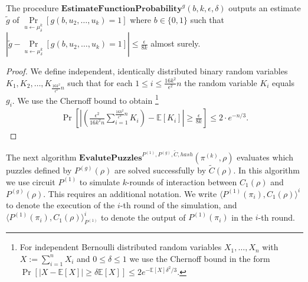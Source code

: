 %
\begin{lemma}
  \label{lemma:estimate_of_g}
  The procedure $\textbf{EstimateFunctionProbability}^{g}(b, k, \epsilon, \delta)$ outputs an estimate $\widetilde{g}$
  of $\underset{u \leftarrow \mu_{\delta}^k}{\Pr}[g(b, u_2, \dots, u_k) = 1]$ where $b \in \{0,1\}$
  such that $| \widetilde{g} - \underset{u \leftarrow \mu_{\delta}^{k}}{\Pr}\left[g(b,u_2, \dots, u_k) = 1\right] | \leq \frac{\epsilon}{8k}$ almost surely.
\end{lemma}
%
\begin{proof}
We define independent, identically distributed binary random variables $K_1, K_2, \dots, K_{\frac{16k^2}{\epsilon^2} n}$
such that for each $1 \leq i \leq \frac{16k^2}{\epsilon^2} n$
the random variable $K_i$ equals $g_i$. We use the Chernoff bound to obtain
\footnote{For independent Bernoulli distributed random variables $X_1, \dots, X_n$ with $X := \sum_{i=1}^n X_i$ and $0 \leq \delta \leq 1$
  we use the Chernoff bound in the form $\Pr[|X - \mathbb{E}[X]| \geq \delta \mathbb{E}[X]] \leq 2 e^{- \mathbb{E}[X] \delta^2 / 3}$.}
\begin{align*}
  \Pr \left[\left|\left(\frac{\epsilon^2}{16k^2n} \sum_{i=1}^{\frac{16k^2}{\epsilon^2}n } K_i \right) - \mathbb{E}[K_i]\right|
    \geq \frac{\epsilon}{8k} \right] \leq 2 \cdot e^{-n/3}.
\end{align*}
\end{proof}
%
%
The next algorithm $\textbf{EvalutePuzzles}^{P^{(1)}, P^{(g)}, \widetilde{C}, hash}(\pi^{(k)}, \rho)$
evaluates which puzzles defined by $P^{(g)}(\rho)$ are solved successfully by $\widetilde{C}(\rho)$.
In this algorithm we use circuit $P^{(1)}$ to simulate $k$-rounds of interaction between $C_1(\rho)$ and $P^{(g)}(\rho)$.
This requires an additional notation. We write $\langle P^{(1)}(\pi_i), C_1(\rho)\rangle^i$ to denote the execution of the $i$-th round of the simulation, and
$\langle P^{(1)}(\pi_i), C_1(\rho)\rangle^i_{P^{(1)}}$
to denote the output of $P^{(1)}(\pi_i)$ in the $i$-th round.
%
